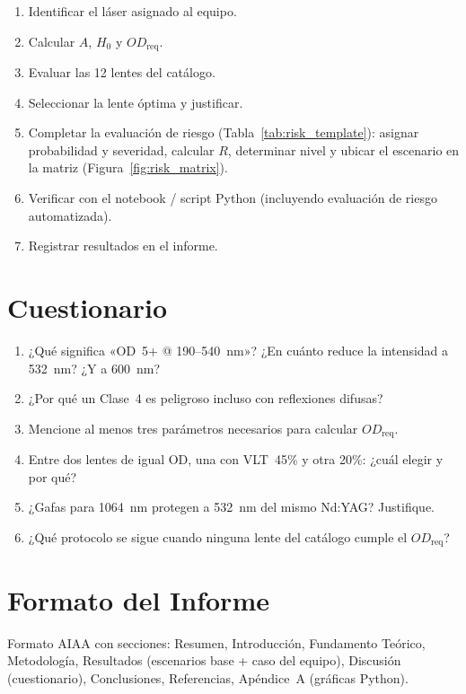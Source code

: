 \documentclass[12pt,a4paper]{article}
\begin{document}
\begin{enumerate}
	\item Identificar el láser asignado al equipo.
	\item Calcular $A$, $H_0$ y $OD_{\mathrm{req}}$.
	\item Evaluar las 12 lentes del catálogo.
	\item Seleccionar la lente óptima y justificar.
	\item Completar la evaluación de riesgo (Tabla~\ref{tab:risk_template}):
	      asignar probabilidad y severidad, calcular $R$, determinar nivel
	      y ubicar el escenario en la matriz (Figura~\ref{fig:risk_matrix}).
	\item Verificar con el notebook / script Python (incluyendo evaluación
	      de riesgo automatizada).
	\item Registrar resultados en el informe.
\end{enumerate}

\section{Cuestionario}
\label{sec:cuestionario}

\begin{enumerate}
	\item ¿Qué significa «OD~5+ @ 190--540~nm»? ¿En cuánto reduce la intensidad
	      a 532~nm? ¿Y a 600~nm?
	\item ¿Por qué un Clase~4 es peligroso incluso con reflexiones difusas?
	\item Mencione al menos tres parámetros necesarios para calcular
	      $OD_{\mathrm{req}}$.
	\item Entre dos lentes de igual OD, una con VLT~45\% y otra 20\%: ¿cuál
	      elegir y por qué?
	\item ¿Gafas para 1064~nm protegen a 532~nm del mismo Nd:YAG? Justifique.
	\item ¿Qué protocolo se sigue cuando ninguna lente del catálogo cumple
	      el $OD_{\mathrm{req}}$?
\end{enumerate}

\section{Formato del Informe}
\label{sec:informe}

Formato AIAA con secciones: Resumen, Introducción, Fundamento Teórico,
Metodología, Resultados (escenarios base + caso del equipo), Discusión
(cuestionario), Conclusiones, Referencias, Apéndice~A (gráficas Python).
\end{document}
